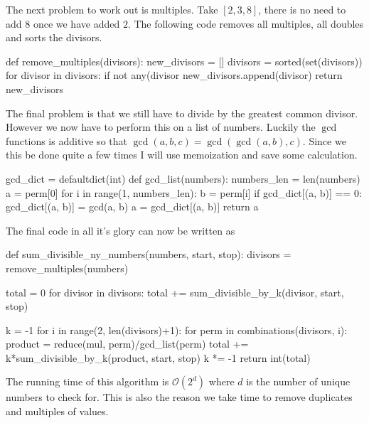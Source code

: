 The next problem to work out is multiples. Take $[2, 3, 8]$, there is no need to add $8$ once we have added $2$. The following code
removes all multiples, all doubles and sorts the divisors. 
%
\begin{pythoncode}
def remove_multiples(divisors):
    new_divisors = []
    divisors = sorted(set(divisors))
    for divisor in divisors:
        if not any(divisor %
            new_divisors.append(divisor)
    return new_divisors
\end{pythoncode}
%
The final problem is that we still have to divide by the greatest common divisor. However we now have to perform this on a list of numbers.
Luckily the $\gcd$ functions is additive so that $\gcd(a, b, c) = \gcd( \gcd(a, b), c)$. Since we this be done quite a few times
I will use memoization and save some calculation. 
%
\begin{pythoncode}
gcd_dict = defaultdict(int)
def gcd_list(numbers):
    numbers_len = len(numbers)
    a = perm[0]
    for i in range(1, numbers_len):
        b = perm[i]
        if gcd_dict[(a, b)] == 0:
            gcd_dict[(a, b)] = gcd(a, b)
        a = gcd_dict[(a, b)]
    return a
\end{pythoncode}
%
The final code in all it's glory can now be written as
%
\begin{pythoncode}
def sum_divisible_ny_numbers(numbers, start, stop):
    divisors = remove_multiples(numbers)

    total = 0
    for divisor in divisors:
        total += sum_divisible_by_k(divisor, start, stop)

    k = -1
    for i in range(2, len(divisors)+1):
        for perm in combinations(divisors, i):
            product = reduce(mul, perm)/gcd_list(perm)
            total += k*sum_divisible_by_k(product, start, stop)
        k *= -1
    return int(total)
\end{pythoncode}
%
The running time of this algorithm is $\mathcal{O}(2^{d})$ where $d$ is the number of unique numbers to check for. This is also the reason we take time to remove duplicates
and multiples of values. 

% 
% 

